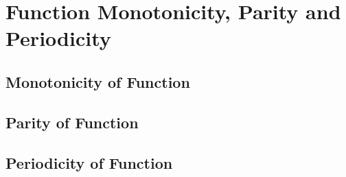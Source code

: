 \chapterspaceabove{6.75cm} 
\chapterspacebelow{7.25cm} 
\chapter{Function Monotonicity, Parity and Periodicity}

    \section{Monotonicity of Function}


    \section{Parity of Function}


    \section{Periodicity of Function}